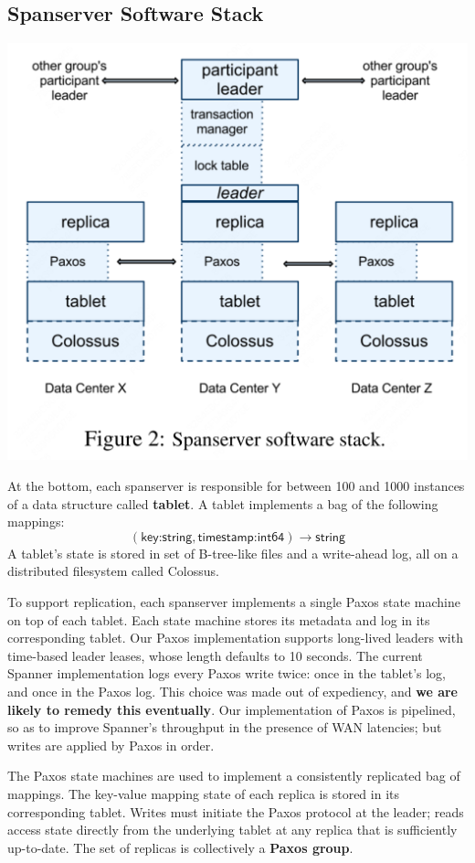 \documentclass[11pt]{article}
\begin{document}
\subsection{Spanserver Software Stack}
\label{sec:orgff5d617}
\begin{center}
\includegraphics[width=.7\textwidth]{../../images/papers/59.png}
\label{}
\end{center}
At the bottom, each spanserver is responsible for between 100 and 1000 instances of a data structure
called \textbf{tablet}. A tablet implements a bag of the following mappings:
\begin{equation*}
(\textsf{key:string}, \textsf{timestamp:int64})\to\textsf{string}
\end{equation*}
A tablet's state is stored in set of B-tree-like files and a write-ahead log, all on a distributed
filesystem called Colossus.

To support replication, each spanserver implements a single Paxos state machine on top of each tablet.
Each state machine stores its metadata and log in its corresponding tablet. Our Paxos implementation
supports long-lived leaders with time-based leader leases, whose length defaults to 10 seconds. The
current Spanner implementation logs every Paxos write twice: once in the tablet’s log, and once in the
Paxos log. This choice was made out of expediency, and \textbf{we are likely to remedy this eventually}. Our
implementation of Paxos is pipelined, so as to improve Spanner’s throughput in the presence of WAN
latencies; but writes are applied by Paxos in order.

The Paxos state machines are used to implement a consistently replicated bag of mappings. The
key-value mapping state of each replica is stored in its corresponding tablet. Writes must initiate
the Paxos protocol at the leader; reads access state directly from the underlying tablet at any
replica that is sufficiently up-to-date. The set of replicas is collectively a \textbf{Paxos group}.
\end{document}
